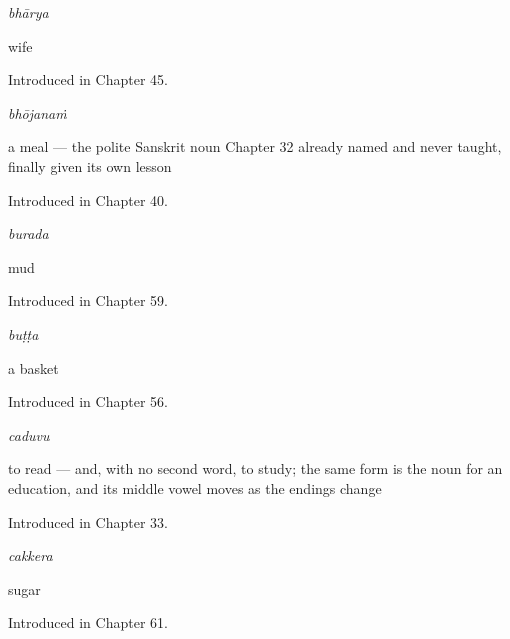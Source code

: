 \noindent\begin{minipage}[t]{\linewidth}
\raggedright
\textbf{}\enspace\emph{bhārya}\par
\small wife\par
\footnotesize Introduced in Chapter 45.
\end{minipage}\par\medskip

\noindent\begin{minipage}[t]{\linewidth}
\raggedright
\textbf{}\enspace\emph{bhōjanaṁ}\par
\small a meal — the polite Sanskrit noun Chapter 32 already named and never taught, finally given its own lesson\par
\footnotesize Introduced in Chapter 40.
\end{minipage}\par\medskip

\noindent\begin{minipage}[t]{\linewidth}
\raggedright
\textbf{}\enspace\emph{burada}\par
\small mud\par
\footnotesize Introduced in Chapter 59.
\end{minipage}\par\medskip

\noindent\begin{minipage}[t]{\linewidth}
\raggedright
\textbf{}\enspace\emph{buṭṭa}\par
\small a basket\par
\footnotesize Introduced in Chapter 56.
\end{minipage}\par\medskip

\noindent\begin{minipage}[t]{\linewidth}
\raggedright
\textbf{}\enspace\emph{caduvu}\par
\small to read — and, with no second word, to study; the same form is the noun for an education, and its middle vowel moves as the endings change\par
\footnotesize Introduced in Chapter 33.
\end{minipage}\par\medskip

\noindent\begin{minipage}[t]{\linewidth}
\raggedright
\textbf{}\enspace\emph{cakkera}\par
\small sugar\par
\footnotesize Introduced in Chapter 61.
\end{minipage}\par\medskip

